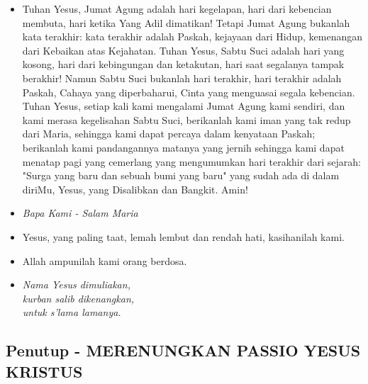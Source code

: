 \documentclass[a5paper,headsepline,titlepage,10pt,nnormalheadings,DIVcalc]{scrbook}
\newcommand{\BU}[1]{\begin{itemize} \item[U:] #1 \end{itemize}}
\newcommand{\BP}[1]{\begin{itemize} \item[P:] #1 \end{itemize}}
\newcommand{\kasihanilahKami}{\BP{Yesus, yang paling taat, lemah lembut dan rendah hati, kasihanilah kami.}
\BU{Allah ampunilah kami orang berdosa.}}
\begin{document}
\BU{Tuhan Yesus, Jumat Agung adalah hari kegelapan, hari dari kebencian membuta, hari ketika Yang Adil dimatikan! Tetapi Jumat Agung bukanlah kata terakhir: kata terakhir adalah Paskah, kejayaan dari Hidup, kemenangan dari Kebaikan atas Kejahatan. Tuhan Yesus, Sabtu Suci adalah hari yang kosong, hari dari kebingungan dan ketakutan, hari saat segalanya tampak berakhir! Namun Sabtu Suci bukanlah hari terakhir, hari terakhir adalah Paskah, Cahaya yang diperbaharui, Cinta yang menguasai segala kebencian. Tuhan Yesus, setiap kali kami mengalami Jumat Agung kami sendiri, dan kami merasa kegelisahan Sabtu Suci, berikanlah kami iman yang tak redup dari Maria, sehingga kami dapat percaya dalam kenyataan Paskah; berikanlah kami pandangannya matanya yang jernih sehingga kami dapat menatap pagi yang cemerlang yang mengumumkan hari terakhir dari sejarah: "Surga yang baru dan sebuah bumi yang baru" yang sudah ada di dalam diriMu, Yesus, yang Disalibkan dan Bangkit. Amin! }

\large\begin{itemize}\item[~]\it{Bapa Kami - Salam Maria}\end{itemize}\normalsize
\kasihanilahKami

\begin{itemize}
\item[15.] \it{Nama Yesus dimuliakan,\\
	kurban salib dikenangkan,\\
	untuk s’lama lamanya.}
\end{itemize}

\subsection*{Penutup - MERENUNGKAN PASSIO YESUS KRISTUS}
\end{document}
